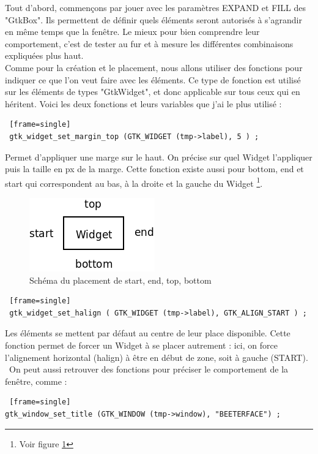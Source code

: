 \documentclass[11pt,french,a4paper]{report}
\begin{document}
Tout d'abord, commençons par jouer avec les paramètres EXPAND et FILL des "GtkBox". Ils permettent de définir quels éléments seront 
autorisés à s'agrandir en même temps que la fenêtre. Le mieux pour bien comprendre leur comportement, c'est de tester au fur
et à mesure les différentes combinaisons expliquées plus haut. \\
Comme pour la création et le placement, nous allons utiliser des fonctions pour indiquer ce que l'on veut faire avec les éléments.
Ce type de fonction est utilisé sur les éléments de types "GtkWidget", et donc applicable sur tous ceux qui en héritent. Voici les
deux fonctions et leurs variables que j'ai le plus utilisé : \\
\begin{lstlisting} [frame=single]
 gtk_widget_set_margin_top (GTK_WIDGET (tmp->label), 5 ) ; 
\end{lstlisting}
Permet d'appliquer une marge sur le haut. On précise sur quel Widget l'appliquer puis la taille en px de la marge.
Cette fonction existe aussi pour bottom, end et start qui correspondent au bas, à la droite et la gauche du Widget
\footnote{Voir figure \ref{sch_pla_top}}.\\
\begin{figure} [!h]
    \centering
        \includegraphics[scale=0.5]{../images/dia/top_bottom_etc.png}
        \caption{Schéma du placement de start, end, top, bottom}
        \label{sch_pla_top}
\end{figure}
\begin{lstlisting} [frame=single]
 gtk_widget_set_halign ( GTK_WIDGET (tmp->label), GTK_ALIGN_START ) ;
\end{lstlisting}
Les éléments se mettent par défaut au centre de leur place disponible. Cette fonction permet 
de forcer un Widget à se placer autrement : ici, on force l'alignement horizontal (halign) à être en début de zone, 
soit à gauche (START). \
On peut aussi retrouver des fonctions pour préciser le comportement de la fenêtre, comme :
\begin{lstlisting} [frame=single]
gtk_window_set_title (GTK_WINDOW (tmp->window), "BEETERFACE") ; 
\end{lstlisting}
\end{document}
